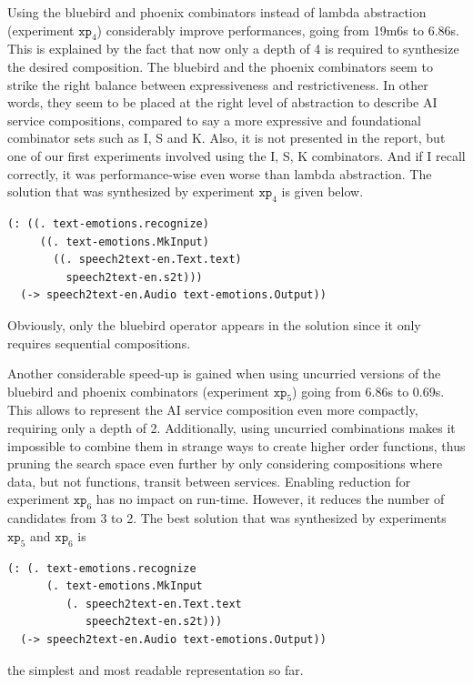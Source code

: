 \documentclass[]{report}
\begin{document}
Using the bluebird and phoenix combinators instead of lambda
abstraction (experiment $\texttt{xp}_4$) considerably improve
performances, going from 19m6s to 6.86s.  This is explained by the
fact that now only a depth of 4 is required to synthesize the desired
composition.  The bluebird and the phoenix combinators seem to strike
the right balance between expressiveness and restrictiveness.  In
other words, they seem to be placed at the right level of abstraction
to describe AI service compositions, compared to say a more expressive
and foundational combinator sets such as I, S and K.  Also, it is not
presented in the report, but one of our first experiments involved
using the I, S, K combinators.  And if I recall correctly, it was
performance-wise even worse than lambda abstraction.  The solution
that was synthesized by experiment $\texttt{xp}_4$ is given below.
\begin{verbatim}
(: ((. text-emotions.recognize)
     ((. text-emotions.MkInput)
       ((. speech2text-en.Text.text)
         speech2text-en.s2t)))
  (-> speech2text-en.Audio text-emotions.Output))
\end{verbatim}
Obviously, only the bluebird operator appears in the solution since it
only requires sequential compositions.

Another considerable speed-up is gained when using uncurried versions
of the bluebird and phoenix combinators (experiment $\texttt{xp}_5$)
going from 6.86s to 0.69s.  This allows to represent the AI service
composition even more compactly, requiring only a depth of 2.
Additionally, using uncurried combinations makes it impossible to
combine them in strange ways to create higher order functions, thus
pruning the search space even further by only considering compositions
where data, but not functions, transit between services.  Enabling
reduction for experiment $\texttt{xp}_6$ has no impact on run-time.
However, it reduces the number of candidates from 3 to 2.  The best
solution that was synthesized by experiments $\texttt{xp}_5$ and
$\texttt{xp}_6$ is
\begin{verbatim}
(: (. text-emotions.recognize
      (. text-emotions.MkInput
         (. speech2text-en.Text.text
            speech2text-en.s2t)))
  (-> speech2text-en.Audio text-emotions.Output))
\end{verbatim}
the simplest and most readable representation so far.
\end{document}
